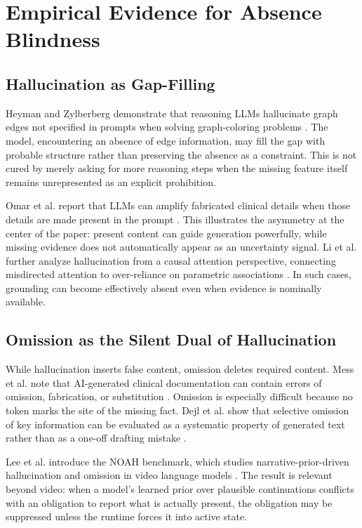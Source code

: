 \documentclass[10pt,conference]{IEEEtran}
\begin{document}
\section{Empirical Evidence for Absence Blindness}
\subsection{Hallucination as Gap-Filling}
Heyman and Zylberberg demonstrate that reasoning LLMs hallucinate graph edges not specified in prompts when solving graph-coloring problems \cite{heyman2025reasoning}. The model, encountering an absence of edge information, may fill the gap with probable structure rather than preserving the absence as a constraint. This is not cured by merely asking for more reasoning steps when the missing feature itself remains unrepresented as an explicit prohibition.

Omar et al. report that LLMs can amplify fabricated clinical details when those details are made present in the prompt \cite{omar2025multimodel}. This illustrates the asymmetry at the center of the paper: present content can guide generation powerfully, while missing evidence does not automatically appear as an uncertainty signal. Li et al. further analyze hallucination from a causal attention perspective, connecting misdirected attention to over-reliance on parametric associations \cite{li2024look}. In such cases, grounding can become effectively absent even when evidence is nominally available.

\subsection{Omission as the Silent Dual of Hallucination}
While hallucination inserts false content, omission deletes required content. Mess et al. note that AI-generated clinical documentation can contain errors of omission, fabrication, or substitution \cite{mess2025scribe}. Omission is especially difficult because no token marks the site of the missing fact. Dejl et al. show that selective omission of key information can be evaluated as a systematic property of generated text rather than as a one-off drafting mistake \cite{dejl2025comprehensiveness}.

Lee et al. introduce the NOAH benchmark, which studies narrative-prior-driven hallucination and omission in video language models \cite{lee2025noah}. The result is relevant beyond video: when a model's learned prior over plausible continuations conflicts with an obligation to report what is actually present, the obligation may be suppressed unless the runtime forces it into active state.
\end{document}
